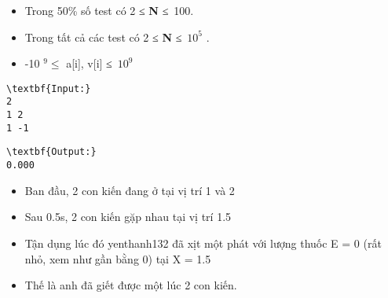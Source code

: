 \begin{itemize}
	\item Trong 50\% số test có 2 ≤ \textbf{ N } ≤ 100.
	\item Trong tất cả các test có 2 ≤ \textbf{ N } ≤ $10^{5}$ .
	\item -10 $^ 9 ≤ $ a[i], v[i] ≤ $10^{9}$
\end{itemize}
\begin{itemize}
\end{itemize}
\begin{verbatim}
\textbf{Input:}
2
1 2
1 -1
\end{verbatim}
\begin{verbatim}
\textbf{Output:}
0.000\end{verbatim}
\begin{itemize}
	\item Ban đầu, 2 con kiến đang ở tại vị trí 1 và 2
	\item Sau 0.5s, 2 con kiến gặp nhau tại vị trí 1.5
	\item Tận dụng lúc đó yenthanh132 đã xịt một phát với lượng thuốc E = 0 (rất nhỏ, xem như gần bằng 0) tại X = 1.5
	\item Thế là anh đã giết được một lúc 2 con kiến.
\end{itemize}